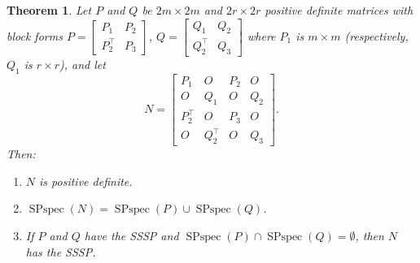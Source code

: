\documentclass[12pt]{article}
\newtheorem{thm}{Theorem}[section]
\theoremstyle{definition}
\theoremstyle{definition}
\theoremstyle{definition}
\numberwithin{figure}{section}
\numberwithin{equation}{section}
\newcommand{\trans}{^{\top}}
\newcommand{\spspec}{\operatorname{SPspec}}
\newcommand{\ben}{\begin{enumerate}}
\newcommand{\een}{\end{enumerate}}
\begin{document}
 \begin{thm}
\label{directsum}
Let $P$ and $Q$ be  $2m \times 2m$ 
and $2r \times 2r$  positive definite matrices
with block forms
$
P=\left[ \begin{array}{cc}
P_1  & P_2 \\ 
P_2\trans & P_3 \end{array} \right]$,
$Q=\left[ \begin{array}{cc}
Q_1  & Q_2 \\ 
Q_2\trans & Q_3 \end{array} \right]$
where $P_1$ is $m\times m$ (respectively, $Q_1$ is 
$r \times r$), 
and let 
\[ N=\left[ 
\begin{array}{cccc}
P_1 & O & P_2 & O \\  
O & Q_1 & O & Q_2 \\ 
P_2\trans & O &P_3 & O \\  
O & Q_2\trans & O & Q_3
\end{array} \right]. 
\] 
Then: 
\ben[$(a)$]
\item 
\label{directsum-a}
$N$ is positive definite.
\item
\label{directsum-b}$
\spspec(N)=\spspec(P) \cup \spspec(Q)$.
\item
\label{directsum-c}
If $P$ and $Q$ have the SSSP and  $\spspec(P) \cap \spspec(Q)= \emptyset$, then $N$ has the SSSP. 
\een
\end{thm}
\end{document}
